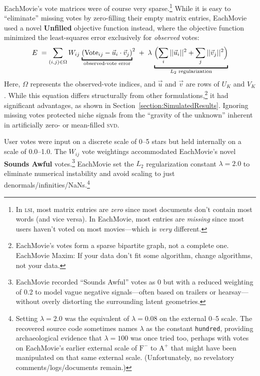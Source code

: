 \documentclass[sigconf,authorversion,screen,microtype={protrusion=true,expansion,kerning,spacing}]{acmart}
\begin{document}
EachMovie's vote matrices were of course very sparse.\footnote{In \textsc{lsi}, most matrix entries are \emph{zero} since most documents don't contain most words (and vice versa). In EachMovie, most entries are \emph{missing} since most users haven't voted on most movies---which is \emph{very} different.} While it is easy to ``eliminate'' missing votes by zero-filling their empty matrix entries, EachMovie used a novel \textbf{Unfilled} objective function instead, where the objective function minimized the least-squares error exclusively for \emph{observed} votes:
\begin{equation}
E \;= \sum_{(i,j) \in \Omega} W_{ij} \; {\underbracket{(\text{Vote}_{ij} - \vec{u}_i \cdot \vec{v}_j) }_\text{observed-vote error}} ^ 2 \; + \; \lambda \, \underbracket{\Bigl( \sum_{i} ||\vec{u}_i||^2 + \sum_{j} ||\vec{v}_j||^2 \Bigr)}_{\text{\ensuremath{L_2} regularization}} \nonumber
\end{equation}
Here, $\Omega$ represents the observed-vote indices, and $\vec{u}$ and $\vec{v}$ are rows of $U_K$ and $V_K$. While this equation differs structurally from other formulations,\footnote{EachMovie's votes form a sparse bipartite graph, not a complete one. EachMovie Maxim\texttrademark{}: If your data don't fit some algorithm, change algorithms, not your data.} it had significant advantages, as shown in Section~\ref{section:SimulatedResults}. Ignoring missing votes protected niche signals from the ``gravity of the unknown'' inherent in artificially zero- or mean-filled \textsc{svd}.

User votes were input on a discrete scale of 0--5 stars but held internally on a scale of 0.0--1.0. The $W_{ij}$ vote weightings accommodated EachMovie's novel \textbf{Sounds Awful} votes.\footnote{EachMovie recorded ``Sounds Awful'' votes as 0 but with a reduced weighting of 0.2 to model vague negative signals---often based on trailers or hearsay---without overly distorting the surrounding latent geometries.} EachMovie set the $L_2$ regularization constant $\lambda = 2.0$ to eliminate numerical instability and avoid scaling to just denormals/\allowbreak{}infinities/\allowbreak{}NaNs.\footnote{Setting $\lambda = 2.0$ was the equivalent of $\lambda = 0.08$ on  the external 0--5 scale. The recovered source code sometimes names $\lambda$ as the constant \texttt{hundred}, providing archaeological evidence that $\lambda = 100$ was once tried too, perhaps with votes on EachMovie's earlier external scale of $\mathrm{F}^-$ to $\mathrm{A}^+$ that might have been manipulated on that same external scale. (Unfortunately, no revelatory comments/\allowbreak{}logs/\allowbreak{}documents remain.)}
\end{document}
